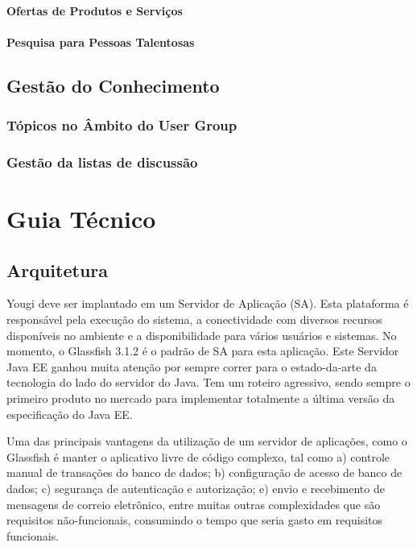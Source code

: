 \documentclass[envcountsame,envcountchap]{svmono}
\begin{document}
\subsection{Ofertas de Produtos e Serviços}

\subsection{Pesquisa para Pessoas Talentosas}

\chapter{Gestão do Conhecimento}

\section{Tópicos no Âmbito do User Group}

\section{Gestão da listas de discussão}

\part{Guia Técnico}

\chapter{Arquitetura}

Yougi deve ser implantado em um Servidor de Aplicação (SA). Esta plataforma é responsável pela execução do sistema, a conectividade com diversos recursos disponíveis no ambiente e a disponibilidade para vários usuários e sistemas. No momento, o Glassfish 3.1.2 é o padrão de SA para esta aplicação. Este Servidor Java EE ganhou muita atenção por sempre correr para o estado-da-arte da tecnologia do lado do servidor do Java. Tem um roteiro agressivo, sendo sempre o primeiro produto no mercado para implementar totalmente a última versão da especificação do Java EE.

Uma das principais vantagens da utilização de um servidor de aplicações, como o Glassfish é manter o aplicativo livre de código complexo, tal como a) controle manual de transações do banco de dados; b) configuração de acesso de banco de dados; c) segurança de autenticação e autorização; e) envio e recebimento de mensagens de correio eletrônico, entre muitas outras complexidades que são requisitos não-funcionais, consumindo o tempo que seria gasto em requisitos funcionais.
\end{document}
